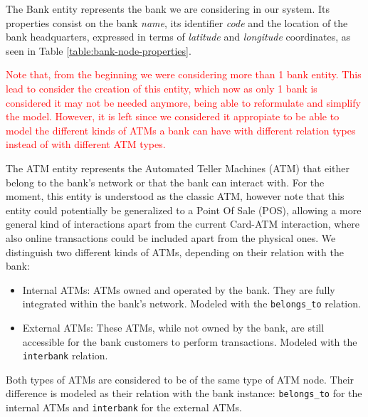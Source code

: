 The Bank entity represents the bank we are considering in our system. Its properties consist
on the bank \emph{name}, its identifier \emph{code} and the location
of the bank headquarters, expressed in terms of \emph{latitude} and \emph{longitude}
coordinates, as seen in Table \ref{table:bank-node-properties}.
  


\begin{tcolorbox}
\textcolor{red}{Note that, from the beginning we were considering more than 1 bank entity. This lead to consider the creation of this entity, which now as only 1 bank is considered it may not be needed anymore, being able to reformulate and simplify the model. However, it is left since we considered it appropiate to be able to model the different kinds of ATMs a bank can have with different relation types instead of with different ATM types.}
\end{tcolorbox}

The ATM entity represents the Automated Teller Machines (ATM) that either belong to the bank's network or that the bank can interact with.
For the moment, this entity is understood as the classic ATM, however note that this entity could potentially be generalized to a Point Of Sale (POS), allowing a more general kind of interactions apart from the current Card-ATM interaction, where also online transactions could be included apart from the physical ones. We distinguish two different kinds of ATMs, depending on their relation with the bank:

\begin{itemize}
  \item Internal ATMs: ATMs owned and operated by the bank. They are fully integrated within the
  bank's network. Modeled with the \texttt{belongs\_to} relation.
  \item External ATMs: These ATMs, while not owned by the bank, are still accessible for the bank
  customers to perform transactions. Modeled with the \texttt{interbank} relation. 
\end{itemize}

Both types of ATMs are considered to be of the same type of ATM node. Their difference
is modeled as their relation with the bank instance: \texttt{belongs\_to} for the internal ATMs and \texttt{interbank} for the external ATMs.



